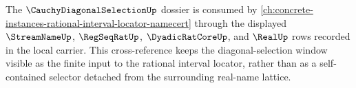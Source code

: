 The $\CauchyDiagonalSelectionUp$ dossier is consumed by \autoref{ch:concrete-instances-rational-interval-locator-namecert} through the displayed $\StreamNameUp$, $\RegSeqRatUp$, $\DyadicRatCoreUp$, and $\RealUp$ rows recorded in the local carrier. This cross-reference keeps the diagonal-selection window visible as the finite input to the rational interval locator, rather than as a self-contained selector detached from the surrounding real-name lattice.
